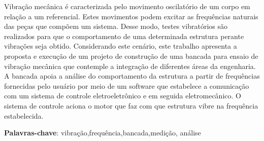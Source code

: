 \begin{resumo}

Vibração mecânica é caracterizada pelo movimento oscilatório de um corpo em relação a um referencial.
Estes movimentos podem excitar as frequências naturais das peças que compõem um sistema. Desse modo, testes vibratórios
são realizados para que o comportamento de uma determinada estrutura perante vibrações seja obtido. Considerando este cenário, este 
trabalho apresenta a proposta e execução de um projeto de construção de uma bancada para ensaio de vibração mecânica que contemple
a integração de diferentes áreas da engenharia. A bancada apoia a análise do comportamento da estrutura
a partir de frequências fornecidas pelo usuário por meio de um software que estabelece a comunicação com um sistema de
controle eletroeletrônico e em seguida eletromecânico. O sistema de controle aciona o motor que faz com que estrutura vibre na
frequência estabelecida.

\vspace{\onelineskip}
    
 \noindent
 \textbf{Palavras-chave}: vibração,frequência,bancada,medição, análise
 
\end{resumo}
